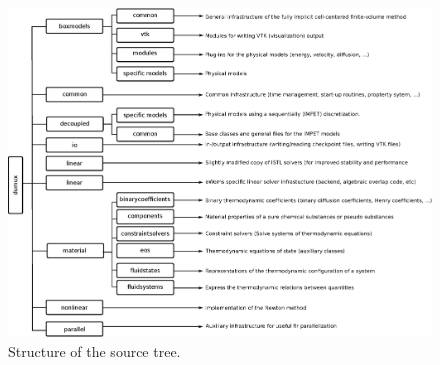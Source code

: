 \begin{landscape}
\begin{figure}[hbt]
  \centering 
  \includegraphics[width=\linewidth, keepaspectratio]{EPS/ewoms_structure.eps}
  \caption{
    \label{fig:dumux-structure}
    Structure of the \eWoms source tree.
  }
\end{figure}
\end{landscape}




